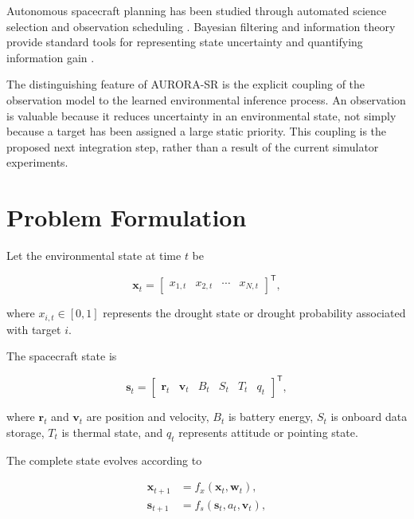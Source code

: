 \documentclass[11pt,a4paper]{article}
\newcommand{\vect}[1]{\bm{#1}}
\newcommand{\AURORASR}{\textsc{AURORA-SR}}
\begin{document}
Autonomous spacecraft planning has been studied through automated
science selection and observation scheduling
\cite{chien2005autonomous}. Bayesian filtering and information theory
provide standard tools for representing state uncertainty and
quantifying information gain \cite{kalman1960,shannon1948}.

The distinguishing feature of \AURORASR{} is the explicit coupling of
the observation model to the learned environmental inference process.
An observation is valuable because it reduces uncertainty in an
environmental state, not simply because a target has been assigned a
large static priority. This coupling is the proposed next integration
step, rather than a result of the current simulator experiments.


\section{Problem Formulation}

Let the environmental state at time $t$ be

\begin{equation}
\vect{x}_t
=
\begin{bmatrix}
x_{1,t} &
x_{2,t} &
\cdots &
x_{N,t}
\end{bmatrix}^{\mathsf T},
\end{equation}

where $x_{i,t}\in[0,1]$ represents the drought state or drought
probability associated with target $i$.

The spacecraft state is

\begin{equation}
\vect{s}_t
=
\begin{bmatrix}
\vect{r}_t &
\vect{v}_t &
B_t &
S_t &
T_t &
q_t
\end{bmatrix}^{\mathsf T},
\end{equation}

where $\vect r_t$ and $\vect v_t$ are position and velocity,
$B_t$ is battery energy, $S_t$ is onboard data storage, $T_t$ is
thermal state, and $q_t$ represents attitude or pointing state.

The complete state evolves according to

\begin{align}
\vect{x}_{t+1}
&=
f_x(\vect{x}_t,\vect{w}_t),\\
\vect{s}_{t+1}
&=
f_s(\vect{s}_t,a_t,\vect{v}_t),
\end{align}
\end{document}
